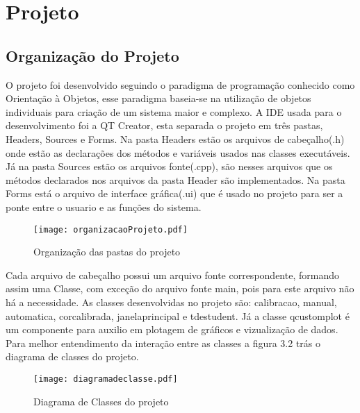	\section{Projeto}
	\subsection{Organização do Projeto}
	 O projeto foi desenvolvido seguindo o paradigma de programação conhecido como  Orientação à Objetos, esse paradigma baseia-se na utilização de objetos individuais para criação de um sistema maior e complexo. A IDE usada para o desenvolvimento foi a QT Creator, esta separada o projeto em três pastas, Headers, Sources e Forms. Na pasta Headers estão os arquivos de cabeçalho(.h) onde estão as declarações dos métodos e variáveis usados nas classes  executáveis. Já na pasta Sources estão os arquivos fonte(.cpp), são nesses arquivos que os métodos declarados nos arquivos da pasta Header são implementados. Na pasta Forms está o arquivo de interface gráfica(.ui) que é usado no projeto para ser a ponte entre o usuario e as funções do sistema.
	 
	\begin{figure}[!h]
		\centering
		\texttt{[image: organizacaoProjeto.pdf]}
		\caption{Organização das pastas do projeto}
		\label{Organizacao do Projeto}
	\end{figure}
	Cada arquivo de cabeçalho possui um arquivo fonte correspondente, formando assim uma Classe, com exceção do arquivo fonte main, pois para este arquivo não há a necessidade.
	As classes desenvolvidas no projeto são:
 calibracao, manual, automatica, corcalibrada, janelaprincipal e tdestudent. Já a classe qcustomplot é um componente para auxilio em plotagem de gráficos e vizualização de dados\cite{QCustomPlot}.
Para melhor entendimento da interação entre as classes a figura 3.2 trás o diagrama de classes do projeto.
	 \begin{figure}[!h]
	 	\centering
	 	\texttt{[image: diagramadeclasse.pdf]}
	 	\caption{Diagrama de Classes do projeto}
	 	\label{DiagramaDeClasse}
	 \end{figure}\newpage


